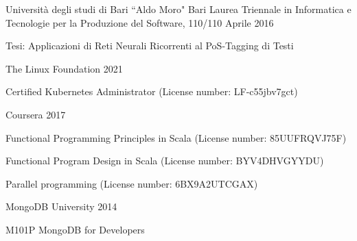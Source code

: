 \documentclass{resume} %
\begin{document}



\cvEntry
  {Universit\`a degli studi di Bari ``Aldo Moro"}
  {Bari}
  {Laurea Triennale in Informatica e Tecnologie per la Produzione del Software, 110/110}
  {Aprile 2016}{
    \begin{cvEntryItems}
      Tesi: Applicazioni di Reti Neurali Ricorrenti al PoS-Tagging di Testi
    \end{cvEntryItems}
}





\cvEntry
  {The Linux Foundation}
  {2021}{}{}{
    \begin{cvEntryItems}
      \item Certified Kubernetes Administrator (License number: LF-c55jbv7gct)
    \end{cvEntryItems}
  }


\cvEntry
  {Coursera}
  {2017}{}{}{
    \begin{cvEntryItems}
      \item Functional Programming Principles in Scala (License number: 85UUFRQVJ75F)
      \item Functional Program Design in Scala (License number: BYV4DHVGYYDU)
      \item Parallel programming (License number: 6BX9A2UTCGAX)
    \end{cvEntryItems}
  }


\cvEntry
  {MongoDB University}
  {2014}{}{}{
    \begin{cvEntryItems}
      \item M101P MongoDB for Developers
    \end{cvEntryItems}
  }

\end{document}
